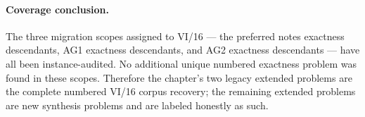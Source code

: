 \paragraph{Coverage conclusion.}
The three migration scopes assigned to VI/16 --- the preferred notes exactness descendants, AG1
exactness descendants, and AG2 exactness descendants --- have all been instance-audited.  No
additional unique numbered exactness problem was found in these scopes.  Therefore the chapter's
two legacy extended problems are the complete numbered VI/16 corpus recovery; the remaining extended problems are
new synthesis problems and are labeled honestly as such.
